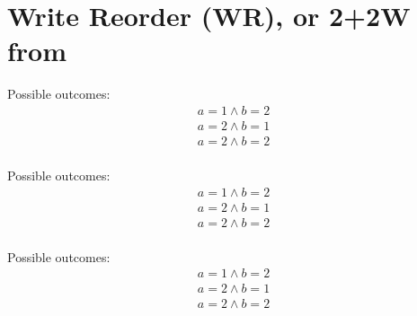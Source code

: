 \section{Write Reorder (WR), or 2+2W from \cite{Lahav-al:POPL16}}
\label{app:wr}

\begin{minipage}[t]{0.3\linewidth}
Possible outcomes:\\
\[\begin{array}{l}
  a = 1 \land b = 2 \\
  a = 2 \land b = 1 \\
  a = 2 \land b = 2 \\
\end{array}\]
\end{minipage}
%
\wrTemplate{\rlx}{\rlx}{\rlx}{\rlx}{\rlx}{\rlx}{\rlx}{\rlx}
\litmusTestEnd

\begin{minipage}[t]{0.3\linewidth}
Possible outcomes:\\
\[\begin{array}{l}
  a = 1 \land b = 2 \\
  a = 2 \land b = 1 \\
  a = 2 \land b = 2 \\
\end{array}\]
\end{minipage}
%
\wrTemplate{\rlx}{\rlx}{\rlx}{\rel}{\rlx}{\rel}{\rlx}{\rlx}
\litmusTestEnd

\begin{minipage}[t]{0.3\linewidth}
Possible outcomes:\\
\[\begin{array}{l}
  a = 1 \land b = 2 \\
  a = 2 \land b = 1 \\
  a = 2 \land b = 2 \\
\end{array}\]
\end{minipage}
%
\wrTemplate{\rel}{\rel}{\rel}{\rel}{\rel}{\rel}{\acq}{\acq}
\litmusTestEnd

